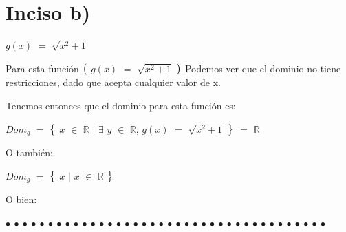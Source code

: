 \documentclass[12pt]{article}
\newenvironment{MyColorPar}[1]{%
    \leavevmode\color{#1}\ignorespaces%
}{%
}%
\begin{document}
\section*{{\textcolor{Cinnabar}{\textsf{\bfseries{Inciso b)}}}}}

\begin{MyColorPar}{Cinnabar} 
    $g(x)$ $=$ $\sqrt{x^{2}+1}$
    \end{MyColorPar} \vspace{0.5cm}

\begin{MyColorPar}{Cinnabar} \bfseries{
{} 
Para esta función $\big{(}$ $g(x)$ $=$ $\sqrt{x^{2}+1}$ $\big{)}$  Podemos ver que el dominio no tiene restricciones, dado que acepta cualquier valor de x. \vspace{0.5cm}

Tenemos entonces que el dominio para esta función es: \vspace{0.5cm}

\hspace{2cm} $Dom_{g}$ $=$ $\big{\{}$ $x$ $\in$ $\mathbb{R}$ $\mid$ $\exists$ $y$ $\in$ $\mathbb{R}$, $g(x)$ $=$ $\sqrt{x^{2}+1}$ $\big{\}}$ $=$ $\mathbb{R}$ \vspace{0.5cm}

O también: 

\hspace{2cm} $Dom_{g}$ $=$ $\big{\{}$ $x$ $\mid$  $x$ $\in$ $\mathbb{R}$ $\big{\}}$ \vspace{0.5cm}

O bien: 

\hspace{3cm}  \vspace{0.5cm}
}
\end{MyColorPar}


\begin{MyColorPar}{Saffron} \bfseries{
 $\bullet$ $\bullet$ $\bullet$ $\bullet$ $\bullet$ $\bullet$ $\bullet$ $\bullet$ $\bullet$ $\bullet$ $\bullet$ $\bullet$ $\bullet$ $\bullet$ $\bullet$ $\bullet$ $\bullet$ $\bullet$ $\bullet$ $\bullet$ $\bullet$ $\bullet$ $\bullet$ $\bullet$ $\bullet$ $\bullet$ $\bullet$ $\bullet$ $\bullet$ $\bullet$ $\bullet$ $\bullet$ $\bullet$ $\bullet$ $\bullet$ $\bullet$ $\bullet$ $\bullet$  }
\end{MyColorPar}
\end{document}
